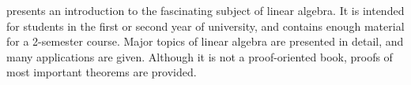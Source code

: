 
\textit{\bookfulltitle} presents an introduction to the fascinating
subject of linear algebra. It is intended for students in the first or
second year of university, and contains enough material for a
2-semester course. Major topics of linear algebra are presented in
detail, and many applications are given. Although it is not a
proof-oriented book, proofs of most important theorems are
provided. 
